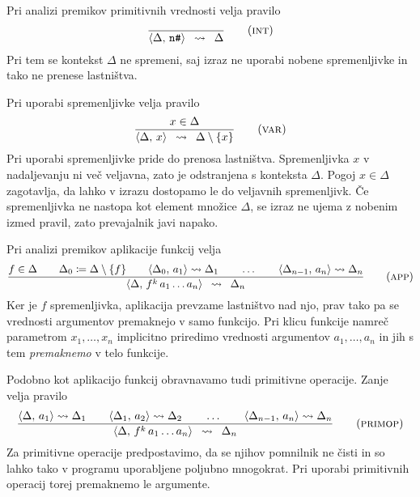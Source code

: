Pri analizi premikov primitivnih vrednosti velja pravilo
\begin{equation}
\infers[int]{}{
    \langle \Delta , \, \texttt{n\#} \rangle
}{
    \Delta
}
\label{eq:int}
\end{equation}
Pri tem se kontekst $\Delta$ ne spremeni, saj izraz ne uporabi nobene spremenljivke in tako ne prenese lastništva.

Pri uporabi spremenljivke velja pravilo
\begin{equation}
\infers[var]{
    x \in \Delta
}{
    \langle \Delta , \, x \rangle
}{
	\Delta \setminus \{ x \}
}
\label{eq:var}
\end{equation}
Pri uporabi spremenljivke pride do prenosa lastništva. Spremenljivka $x$ v nadaljevanju ni več veljavna, zato je odstranjena s konteksta $\Delta$. Pogoj $x \in \Delta$ zagotavlja, da lahko v izrazu dostopamo le do veljavnih spremenljivk. Če spremenljivka ne nastopa kot element množice $\Delta$, se izraz ne ujema z nobenim izmed pravil, zato prevajalnik javi napako.

Pri analizi premikov aplikacije funkcij velja
\begin{equation}
\infers[app]{
    f \in \Delta \qquad \Delta_0 \coloneqq \Delta \setminus \{ f \} \qquad \langle \Delta_0 , \, a_1 \rangle \leadsto \Delta_1 \qquad \dots \qquad \langle \Delta_{n-1} , \, a_n \rangle \leadsto \Delta_n
}{
    \langle \Delta , \, f^k \, a_1 \dots a_n \rangle
}{
	\Delta_n
}
\label{eq:app}
\end{equation}
Ker je $f$ spremenljivka, aplikacija prevzame lastništvo nad njo, prav tako pa se vrednosti argumentov premaknejo v samo funkcijo. Pri klicu funkcije namreč parametrom $x_1, \dots, x_n$ implicitno priredimo vrednosti argumentov $a_1, \dots, a_n$ in jih s tem \emph{premaknemo} v telo funkcije.

Podobno kot aplikacijo funkcij obravnavamo tudi primitivne operacije. Zanje velja pravilo
\begin{equation}
\infers[primop]{
    \langle \Delta , \, a_1 \rangle \leadsto \Delta_1 \qquad \langle \Delta_1 , \, a_2 \rangle \leadsto \Delta_2 \qquad\dots \qquad \langle \Delta_{n-1} , \, a_n \rangle \leadsto \Delta_n
}{
    \langle \Delta , \, f^k \, a_1 \dots a_n \rangle
}{
	\Delta_n
}
\label{eq:primop}
\end{equation}
Za primitivne operacije predpostavimo, da se njihov pomnilnik ne čisti in so lahko tako v programu uporabljene poljubno mnogokrat. Pri uporabi primitivnih operacij torej premaknemo le argumente.

